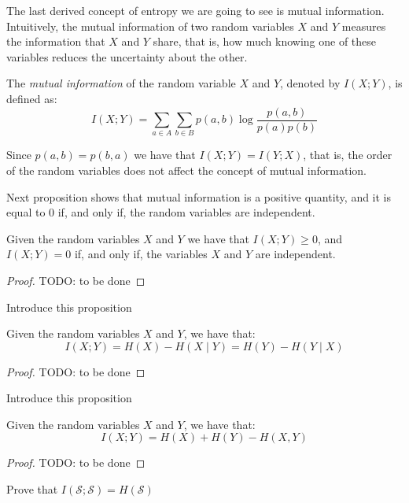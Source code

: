 
The last derived concept of entropy we are going to see is mutual information. Intuitively, the mutual information of two random variables $X$ and $Y$ measures the information that $X$ and $Y$ share, that is, how much knowing one of these variables reduces the uncertainty about the other.

\begin{definition}
The \emph{mutual information} of the random variable $X$ and $Y$, denoted by $I(X ; Y)$, is defined as:
\[
I(X ; Y) = \sum_{a \in A} \sum_{b \in B} p(a, b) \log \frac{p(a, b)}{p(a) p(b)}
\]
\end{definition}

Since $p(a, b) = p(b, a)$ we have that $I(X ; Y) = I(Y ; X)$, that is, the order of the random variables does not affect the concept of mutual information.

Next proposition shows that mutual information is a positive quantity, and it is equal to 0 if, and only if, the random variables are independent.

\begin{proposition}
Given the random variables $X$ and $Y$ we have that $I(X ; Y) \geq 0$, and $I(X ; Y) = 0$ if, and only if, the variables $X$ and $Y$ are independent.
\end{proposition}
\begin{proof}
{\color{red} TODO: to be done}
\end{proof}

{\color{red} Introduce this proposition}

\begin{proposition}
Given the random variables $X$ and $Y$, we have that:
\[
I(X;Y) = H(X) - H(X \mid Y) = H(Y) - H(Y \mid X)
\]
\end{proposition}
\begin{proof}
{\color{red} TODO: to be done}
\end{proof}

{\color{red} Introduce this proposition}

\begin{proposition}
Given the random variables $X$ and $Y$, we have that:
\[
I(X;Y) = H(X) + H(Y) - H(X, Y)
\]
\end{proposition}
\begin{proof}
{\color{red} TODO: to be done}
\end{proof}

{\color{red} Prove that $I(\mathcal{S}; \mathcal{S}) = H(\mathcal{S})$}

